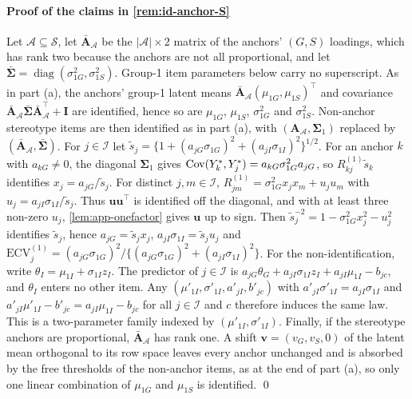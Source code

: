 \paragraph{Proof of the claims in \cref{rem:id-anchor-S}}
Let $\mathcal A\subseteq\mathcal S$, let $\bar{\bm A}_{\mathcal A}$ be the $|\mathcal A|\times2$ matrix of the anchors' $(G,S)$ loadings, which has rank two because the anchors are not all proportional, and let $\bar{\bm\Sigma}=\operatorname{diag}(\sigma^2_{1G},\sigma^2_{1S})$. Group-1 item parameters below carry no superscript. As in part (a), the anchors' group-1 latent means $\bar{\bm A}_{\mathcal A}(\mu_{1G},\mu_{1S})^\top$ and covariance $\bar{\bm A}_{\mathcal A}\bar{\bm\Sigma}\bar{\bm A}_{\mathcal A}^\top+\bm I$ are identified, hence so are $\mu_{1G}$, $\mu_{1S}$, $\sigma^2_{1G}$ and $\sigma^2_{1S}$. Non-anchor stereotype items are then identified as in part (a), with $(\bm A_{\mathcal A},\bm\Sigma_1)$ replaced by $(\bar{\bm A}_{\mathcal A},\bar{\bm\Sigma})$. For $j\in\mathcal I$ let $\tilde s_j=\{1+(a_{jG}\sigma_{1G})^2+(a_{jI}\sigma_{1I})^2\}^{1/2}$. For an anchor $k$ with $a_{kG}\neq0$, the diagonal $\bm\Sigma_1$ gives $\operatorname{Cov}(Y^*_k,Y^*_j)=a_{kG}\sigma^2_{1G}a_{jG}$, so $R^{(1)}_{kj}\tilde s_k$ identifies $x_j=a_{jG}/\tilde s_j$. For distinct $j,m\in\mathcal I$, $R^{(1)}_{jm}=\sigma^2_{1G}x_jx_m+u_ju_m$ with $u_j=a_{jI}\sigma_{1I}/\tilde s_j$. Thus $\bm u\bm u^\top$ is identified off the diagonal, and with at least three non-zero $u_j$, \cref{lem:app-onefactor} gives $\bm u$ up to sign. Then $\tilde s_j^{-2}=1-\sigma^2_{1G}x_j^2-u_j^2$ identifies $\tilde s_j$, hence $a_{jG}=\tilde s_jx_j$, $a_{jI}\sigma_{1I}=\tilde s_ju_j$ and $\mathrm{ECV}^{(1)}_j=(a_{jG}\sigma_{1G})^2/\{(a_{jG}\sigma_{1G})^2+(a_{jI}\sigma_{1I})^2\}$. For the non-identification, write $\theta_I=\mu_{1I}+\sigma_{1I}z_I$. The predictor of $j\in\mathcal I$ is $a_{jG}\theta_G+a_{jI}\sigma_{1I}z_I+a_{jI}\mu_{1I}-b_{jc}$, and $\theta_I$ enters no other item. Any $(\mu'_{1I},\sigma'_{1I},a'_{jI},b'_{jc})$ with $a'_{jI}\sigma'_{1I}=a_{jI}\sigma_{1I}$ and $a'_{jI}\mu'_{1I}-b'_{jc}=a_{jI}\mu_{1I}-b_{jc}$ for all $j\in\mathcal I$ and $c$ therefore induces the same law. This is a two-parameter family indexed by $(\mu'_{1I},\sigma'_{1I})$. Finally, if the stereotype anchors are proportional, $\bar{\bm A}_{\mathcal A}$ has rank one. A shift $\bm v=(v_G,v_S,0)$ of the latent mean orthogonal to its row space leaves every anchor unchanged and is absorbed by the free thresholds of the non-anchor items, as at the end of part (a), so only one linear combination of $\mu_{1G}$ and $\mu_{1S}$ is identified. \qed

